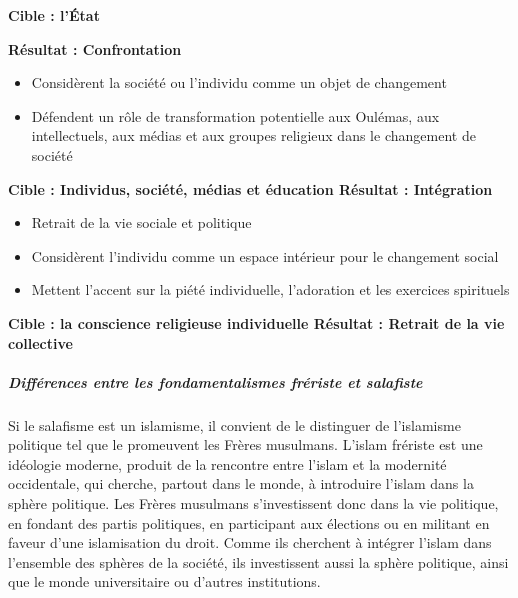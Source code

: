 \textbf{Cible : l'État}

\textbf{Résultat : Confrontation}


\begin{itemize}
\item
  Considèrent la société ou l'individu comme un objet de changement
\item
  Défendent un rôle de transformation potentielle aux Oulémas, aux
  intellectuels, aux médias et aux groupes religieux dans le changement
  de société
\end{itemize}


\textbf{Cible : Individus, société, médias et éducation Résultat :
Intégration}


\begin{itemize}
\item
  
  Retrait de la vie sociale et politique
  
\item
  
  Considèrent l'individu comme un espace intérieur pour le changement
  social
  
\item
  
  Mettent l'accent sur la piété individuelle, l'adoration et les
  exercices spirituels
  
\end{itemize}


\textbf{Cible : la conscience religieuse individuelle Résultat : Retrait
de la vie collective}


\hypertarget{diffuxe9rences-entre-les-fondamentalismes-fruxe9riste-et-salafiste}{%
\subparagraph{Différences entre les fondamentalismes frériste et
salafiste}\label{diffuxe9rences-entre-les-fondamentalismes-fruxe9riste-et-salafiste}}


Si le salafisme est un islamisme, il convient de le distinguer de
l'islamisme politique tel que le promeuvent les Frères musulmans.
L'islam frériste est une idéologie moderne, produit de la rencontre
entre l'islam et la modernité occidentale, qui cherche, partout dans le
monde, à introduire l'islam dans la sphère politique. Les Frères
musulmans s'investissent donc dans la vie politique, en fondant des
partis politiques, en participant aux élections ou en militant en faveur
d'une islamisation du droit. Comme ils cherchent à intégrer l'islam dans
l'ensemble des sphères de la société, ils investissent aussi la sphère
politique, ainsi que le monde universitaire ou d'autres institutions.

